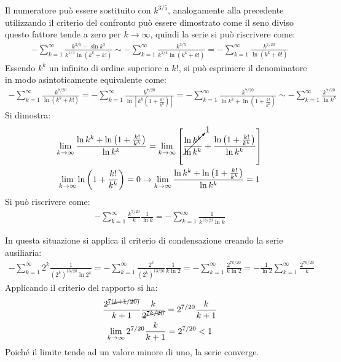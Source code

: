 \documentclass{article}
\numberwithin{equation}{subsection}
\begin{document}
Il numeratore può essere sostituito con $k^{3/5}$, analogamente alla precedente utilizzando il criterio del confronto può essere dimostrato come il seno diviso questo fattore tende a zero per $k\to\infty$, quindi la serie si può riscrivere come:
\begin{gather*}
    -\displaystyle\sum_{k=1}^\infty\frac{k^{3/5}-\sin k^3}{k^{1/4}\ln(k^k+k!)}\sim
    -\displaystyle\sum_{k=1}^\infty\frac{k^{3/5}}{k^{1/4}\ln(k^k+k!)}=
    -\displaystyle\sum_{k=1}^\infty \frac{k^{7/20}}{\ln(k^k+k!)}
\end{gather*}
Essendo $k^k$ un infinito di ordine superiore a $k!$, si può esprimere il denominatore in modo asintoticamente equivalente come:
\begin{gather*}
    -\displaystyle\sum_{k=1}^\infty \frac{k^{7/20}}{\ln(k^k+k!)}=
    -\displaystyle\sum_{k=1}^\infty \frac{k^{7/20}}{\ln\left[k^k\left(1+\frac{k!}{k^k}\right)\right]}=
    -\displaystyle\sum_{k=1}^\infty \frac{k^{7/20}}{\ln k^k+\ln\left(1+\frac{k!}{k^k}\right)}\sim
    -\displaystyle\sum_{k=1}^\infty \frac{k^{7/20}}{\ln k^k}    
\end{gather*}
Si dimostra:
\begin{gather*}
    \lim_{k\to\infty}\frac{\ln k^k+\ln\left(1+\frac{k!}{k^k}\right)}{\ln k^k}=
    \lim_{k\to\infty}\left[\cancelto{1}{\frac{\ln k^k}{\ln k^k}}+\frac{\ln\left(1+\frac{k!}{k^k}\right)}{\ln k^k}\right]\\
    \lim_{k\to\infty}\ln\left(1+\frac{k!}{k^k}\right)=0\rightarrow
    \lim_{k\to\infty}\frac{\ln k^k+\ln\left(1+\frac{k!}{k^k}\right)}{\ln k^k}=1
\end{gather*}
Si può riscrivere come:
\begin{gather*}
    -\displaystyle\sum_{k=1}^\infty\frac{k^{7/20}}{k}\frac{1}{\ln k}=
    -\displaystyle\sum_{k=1}^\infty\frac{1}{k^{13/20}\ln k}
\end{gather*}

In questa situazione si applica il criterio di condensazione creando la serie ausiliaria:
\begin{gather*}
    -\displaystyle\sum_{k=1}^\infty2^k\frac{1}{(2^k)^{13/20}\ln 2^k}=
    -\displaystyle\sum_{k=1}^\infty\frac{2^k}{(2^k)^{13/20}}\frac{1}{k\ln 2}=
    -\displaystyle\sum_{k=1}^\infty\frac{2^{7k/20}}{k\ln 2}=-\frac{1}{\ln 2}\sum_{k=1}^\infty\frac{2^{7k/20}}{k}
\end{gather*}
Applicando il criterio del rapporto si ha:
\begin{gather*}
    \displaystyle\frac{2^{\cancel{7(k+1/20)}}}{k+1}\frac{k}{\cancel{2^{7k/20}}}=2^{7/20}\frac{k}{k+1}\\
    \lim_{k\to\infty}2^{7/20}\frac{k}{k+1}=2^{7/20}<1
\end{gather*}
Poiché il limite tende ad un valore minore di uno, la serie converge. 
\end{document}
